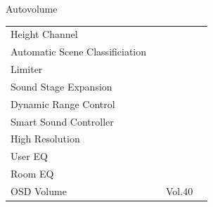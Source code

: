 \documentclass{beamer}
\begin{document}
\begin{frame}[t]{Autovolume}
\begin{tiny}
\begin{tabular}{@{}lccc@{}}
Height Channel & \color{black}{Off} & & \\
Automatic Scene Classificiation & \color{black}{Off} & & \\
Limiter & \color{black}{Off} & & \\
Sound Stage Expansion & \color{black}{Off} & & \\
Dynamic Range Control & \color{black}{Off} & & \\
Smart Sound Controller & \color{black}{Off} & & \\
High Resolution & \color{black}{Off} & & \\
User EQ & \color{black}{Off} & & \\
Room EQ & \color{black}{Off} & & \\
OSD Volume & \color{blue}{On} & Vol.40 & \\
\midrule
\end{tabular}
\end{tiny}

\end{frame}
\end{document}
